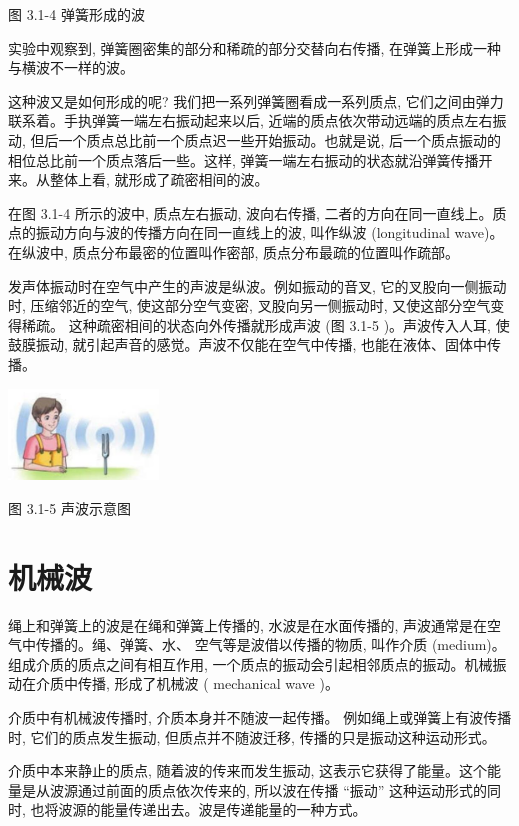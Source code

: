 \documentclass[10pt]{article}
\begin{document}
图 3.1-4 弹簧形成的波

实验中观察到, 弹簧圈密集的部分和稀疏的部分交替向右传播, 在弹簧上形成一种与横波不一样的波。

这种波又是如何形成的呢? 我们把一系列弹簧圈看成一系列质点, 它们之间由弹力联系着。手执弹簧一端左右振动起来以后, 近端的质点依次带动远端的质点左右振动, 但后一个质点总比前一个质点迟一些开始振动。也就是说, 后一个质点振动的相位总比前一个质点落后一些。这样, 弹簧一端左右振动的状态就沿弹簧传播开来。从整体上看, 就形成了疏密相间的波。

在图 3.1-4 所示的波中, 质点左右振动, 波向右传播, 二者的方向在同一直线上。质点的振动方向与波的传播方向在同一直线上的波, 叫作纵波 (longitudinal wave)。在纵波中, 质点分布最密的位置叫作密部, 质点分布最疏的位置叫作疏部。

发声体振动时在空气中产生的声波是纵波。例如振动的音叉, 它的叉股向一侧振动时, 压缩邻近的空气, 使这部分空气变密, 叉股向另一侧振动时, 又使这部分空气变得稀疏。 这种疏密相间的状态向外传播就形成声波 (图 3.1-5 )。声波传入人耳, 使鼓膜振动, 就引起声音的感觉。声波不仅能在空气中传播, 也能在液体、固体中传播。

\begin{center}
\includegraphics[max width=0.3\textwidth]{images/01910e4c-ebb8-7d2c-8f2f-2375bc1d2d12_70_308945.jpg}
\end{center}

图 3.1-5 声波示意图

\section*{机械波}

绳上和弹簧上的波是在绳和弹簧上传播的, 水波是在水面传播的, 声波通常是在空气中传播的。绳、弹簧、水、 空气等是波借以传播的物质, 叫作介质 (medium)。组成介质的质点之间有相互作用, 一个质点的振动会引起相邻质点的振动。机械振动在介质中传播, 形成了机械波 ( mechanical wave )。

介质中有机械波传播时, 介质本身并不随波一起传播。 例如绳上或弹簧上有波传播时, 它们的质点发生振动, 但质点并不随波迁移, 传播的只是振动这种运动形式。

介质中本来静止的质点, 随着波的传来而发生振动, 这表示它获得了能量。这个能量是从波源通过前面的质点依次传来的, 所以波在传播 “振动” 这种运动形式的同时, 也将波源的能量传递出去。波是传递能量的一种方式。
\end{document}
